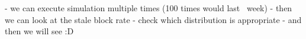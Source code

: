  - we can execute simulation multiple times (100 times would last ~week)
 - then we can look at the stale block rate
 - check which distribution is appropriate
 - and then we will see :D
